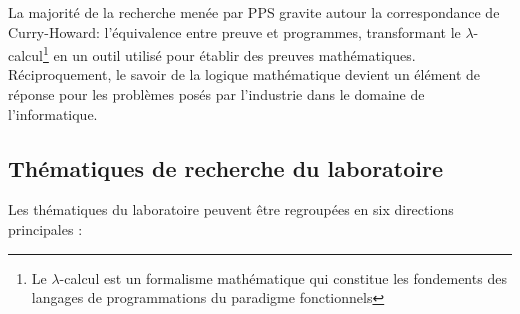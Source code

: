\documentclass[a4paper, 11pt]{report}
\newcommand{\lc}[0]{$\lambda$-calcul\xspace}
\begin{document}
    La majorité de la recherche menée par PPS gravite autour la correspondance
    de Curry-Howard: l'équivalence entre preuve et programmes, transformant
    le \lc\footnote{Le \lc{} est un formalisme mathématique
    qui constitue les fondements des langages de programmations du paradigme fonctionnels} en un
    outil utilisé pour établir des preuves mathématiques. Réciproquement, le
    savoir de la logique mathématique devient un élément de réponse pour les
    problèmes posés par l'industrie dans le domaine de l'informatique.

    \subsection{Thématiques de recherche du laboratoire}
      Les thématiques du laboratoire peuvent être regroupées en six directions
      principales :
\end{document}
